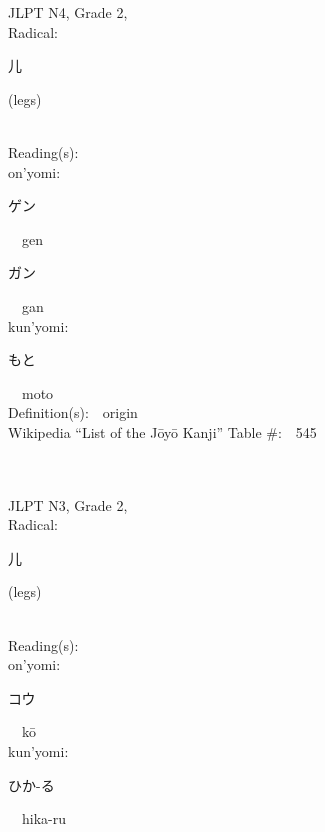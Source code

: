 \begin{multicols}{2}
{JLPT N4, Grade 2, \\Radical:\ \ {\begin{CJK}{UTF8}{min} 儿 \end{CJK}} (legs) } \\
Reading(s):\ \ \\
{\hspace*{1em}}on'yomi:\ \ \\
{\hspace*{2em}}{\begin{CJK}{UTF8}{min} ゲン \end{CJK}}\ \ gen\ \ \\
{\hspace*{2em}}{\begin{CJK}{UTF8}{min} ガン \end{CJK}}\ \ gan\ \ \\
{\hspace*{1em}}kun'yomi:\ \ \\
{\hspace*{2em}}{\begin{CJK}{UTF8}{min} もと \end{CJK}}\ \ moto\ \ \\
Definition(s):\ \ origin \\
Wikipedia ``List of the J\=oy\=o Kanji'' Table \#:\ \ 545 \\
\ \ \\
{\fontsize{34pt}{40pt}  }\ \ \\  %
{JLPT N3, Grade 2, \\Radical:\ \ {\begin{CJK}{UTF8}{min} 儿 \end{CJK}} (legs) } \\
Reading(s):\ \ \\
{\hspace*{1em}}on'yomi:\ \ \\
{\hspace*{2em}}{\begin{CJK}{UTF8}{min} コウ \end{CJK}}\ \ k\=o\ \ \\
{\hspace*{1em}}kun'yomi:\ \ \\
{\hspace*{2em}}{\begin{CJK}{UTF8}{min} ひか-る \end{CJK}}\ \ hika-ru\ \ \\

\end{multicols}
